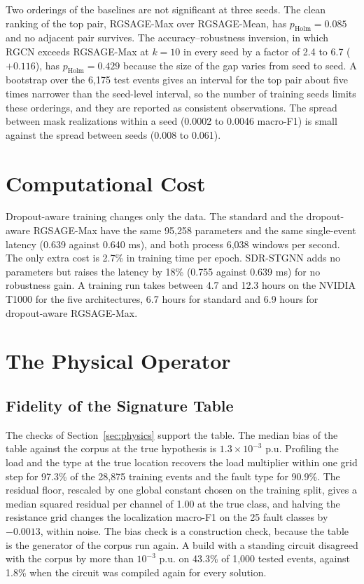 \documentclass[MTech]{ugthesis}
\begin{document}
Two orderings of the baselines are not significant at three seeds. The clean ranking of the top pair, RGSAGE-Max over RGSAGE-Mean, has $p_{\mathrm{Holm}}=0.085$ and no adjacent pair survives. The accuracy--robustness inversion, in which RGCN exceeds RGSAGE-Max at $k=10$ in every seed by a factor of 2.4 to 6.7 ($+0.116$), has $p_{\mathrm{Holm}}=0.429$ because the size of the gap varies from seed to seed. A bootstrap over the 6,175 test events gives an interval for the top pair about five times narrower than the seed-level interval, so the number of training seeds limits these orderings, and they are reported as consistent observations. The spread between mask realizations within a seed (0.0002 to 0.0046 macro-F1) is small against the spread between seeds (0.008 to 0.061).

\section{Computational Cost}

Dropout-aware training changes only the data. The standard and the dropout-aware RGSAGE-Max have the same 95,258 parameters and the same single-event latency (0.639 against 0.640 ms), and both process 6,038 windows per second. The only extra cost is 2.7\% in training time per epoch. \ac{SDR-STGNN} adds no parameters but raises the latency by 18\% (0.755 against 0.639 ms) for no robustness gain. A training run takes between 4.7 and 12.3 hours on the NVIDIA T1000 for the five architectures, 6.7 hours for standard and 6.9 hours for dropout-aware RGSAGE-Max.

\section{The Physical Operator}
\label{sec:opresults}

\subsection{Fidelity of the Signature Table}

The checks of Section~\ref{sec:physics} support the table. The median bias of the table against the corpus at the true hypothesis is $1.3\times10^{-3}$ p.u. Profiling the load and the type at the true location recovers the load multiplier within one grid step for 97.3\% of the 28,875 training events and the fault type for 90.9\%. The residual floor, rescaled by one global constant chosen on the training split, gives a median squared residual per channel of 1.00 at the true class, and halving the resistance grid changes the localization macro-F1 on the 25 fault classes by $-0.0013$, within noise. The bias check is a construction check, because the table is the generator of the corpus run again. A build with a standing circuit disagreed with the corpus by more than $10^{-3}$ p.u. on 43.3\% of 1,000 tested events, against 1.8\% when the circuit was compiled again for every solution.
\end{document}

